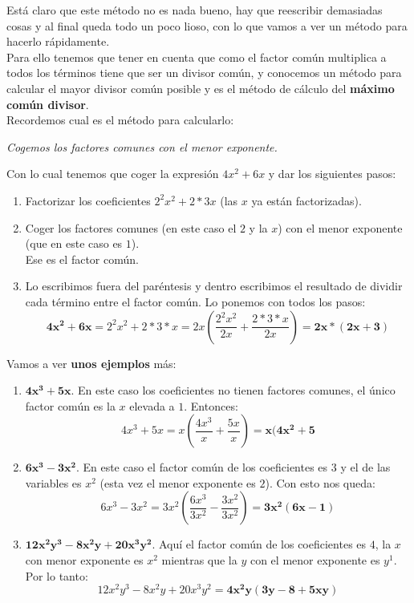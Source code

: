 \documentclass[a4paper,11pt,answers]{exam}
\begin{document}
  Está claro que este método no es nada bueno, hay que reescribir demasiadas cosas y al final queda todo un poco lioso, con lo que vamos a ver un método para hacerlo rápidamente.\\
  Para ello tenemos que tener en cuenta que como el factor común multiplica a todos los términos tiene que ser un divisor común, y conocemos un método para calcular el mayor divisor común posible y es el método de cálculo del \textbf{máximo común divisor}.\\
  Recordemos cual es el método para calcularlo:
  \begin{center}
    \emph{Cogemos los factores comunes con el menor exponente.}
  \end{center}
  Con lo cual tenemos que coger la expresión $4x^2 + 6x$ y dar los siguientes pasos:
  \begin{enumerate}
  \item Factorizar los coeficientes $2^2 x^2 + 2*3 x$ (las $x$ ya están factorizadas).
  \item Coger los factores comunes (en este caso el $2$ y la $x$) con el menor exponente (que en este caso es $1$).\\
    Ese es el factor común.
  \item Lo escribimos fuera del paréntesis y dentro escribimos el resultado de dividir cada término entre el factor común. Lo ponemos con todos los pasos:
    \[\boldsymbol{4x^2 + 6x} = 2^2 x^2 + 2*3*x = 2x\left(\frac{2^2 x^2}{2x} + \frac{2*3*x}{2x}\right) = 
      \boldsymbol{2x*(2x + 3)}\]
  \end{enumerate}

  Vamos a ver \textbf{unos ejemplos} más:\\
  \begin{enumerate}
  \item $\boldsymbol{4x^3 + 5 x}$. En este caso los coeficientes no tienen factores comunes, el único factor común es la $x$ elevada a $1$. Entonces:
    \[4x^3 + 5x = x\left(\frac{4x^3}{x} + \frac{5x}{x}\right) = \boldsymbol{x(4x^2 + 5}\]
    
  \item $\boldsymbol{6x^3 - 3x^2}$. En este caso el factor común de los coeficientes es $3$ y el de las variables es $x^2$ (esta vez el menor exponente es $2$). Con esto nos queda:
    \[6x^3 - 3x^2 = 3x^2 \left(\frac{6x^3}{3x^2} - \frac{3x^2}{3x^2}\right) = \boldsymbol{3x^2 (6x - 1)}\]
    
  \item $\boldsymbol{12x^2y^3 - 8 x^2y + 20x^3 y^2}$. Aquí el factor común de los coeficientes es $4$, la $x$ con menor exponente es $x^2$ mientras que la $y$ con el menor exponente es $y^1$. Por lo tanto:
    \[12x^2y^3 - 8 x^2y + 20x^3 y^2 = \boldsymbol{4x^2 y (3y - 8 + 5x y)}\]
  \end{enumerate}
\end{document}
